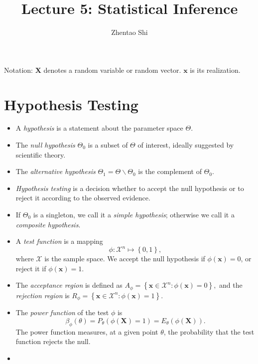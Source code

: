 \documentclass[11pt]{article}
\title{Lecture 5: Statistical Inference}
\author{Zhentao Shi}
\begin{document}
    
    
    \maketitle
    
    

    
    Notation: \(\mathbf{X}\) denotes a random variable or random vector.
\(\mathbf{x}\) is its realization.

\section{Hypothesis Testing}\label{hypothesis-testing}

\begin{itemize}
\item
  A \emph{hypothesis} is a statement about the parameter space
  \(\Theta\).
\item
  The \emph{null hypothesis} \(\Theta_{0}\) is a subset of \(\Theta\) of
  interest, ideally suggested by scientific theory.
\item
  The \emph{alternative hypothesis}
  \(\Theta_{1}=\Theta\backslash\Theta_{0}\) is the complement of
  \(\Theta_{0}\). 
\item \emph{Hypothesis testing} is a decision whether to
  accept the null hypothesis or to reject it according to the observed
  evidence.
\item
  If \(\Theta_0\) is a singleton, we call it a \emph{simple hypothesis};
  otherwise we call it a \emph{composite hypothesis}.
\item
  A \emph{test function} is a mapping
  \[\phi:\mathcal{X}^{n}\mapsto\left\{ 0,1\right\},\] where
  \(\mathcal{X}\) is the sample space. We accept the null hypothesis if
  \(\phi\left(\mathbf{x}\right)=0\), or reject it if
  \(\phi\left(\mathbf{x}\right)=1\).
\item
  The \emph{acceptance region} is defined as
  \(A_{\phi}=\left\{ \mathbf{x}\in\mathcal{X}^{n}:\phi\left(\mathbf{x}\right)=0\right\} ,\)
  and the \emph{rejection region} is
  \(R_{\phi}=\left\{ \mathbf{x}\in\mathcal{X}^{n}:\phi\left(\mathbf{x}\right)=1\right\} .\)
\item
  The \emph{power function} of the test \(\phi\) is
  \[\beta_{\phi}\left(\theta\right)=P_{\theta}\left(\phi\left(\mathbf{X}\right)=1\right)=E_{\theta}\left(\phi\left(\mathbf{X}\right)\right).\]
  The power function measures, at a given point \(\theta\), the
  probability that the test function rejects the null.
\item

\end{itemize}
\end{document}
